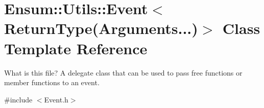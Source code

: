 \hypertarget{class_ensum_1_1_utils_1_1_event_3_01_return_type_07_arguments_8_8_8_08_4}{}\section{Ensum\+:\+:Utils\+:\+:Event$<$ Return\+Type(Arguments...)$>$ Class Template Reference}
\label{class_ensum_1_1_utils_1_1_event_3_01_return_type_07_arguments_8_8_8_08_4}


What is this file? A delegate class that can be used to pass free functions or member functions to an event.  




{\ttfamily \#include $<$Event.\+h$>$}

